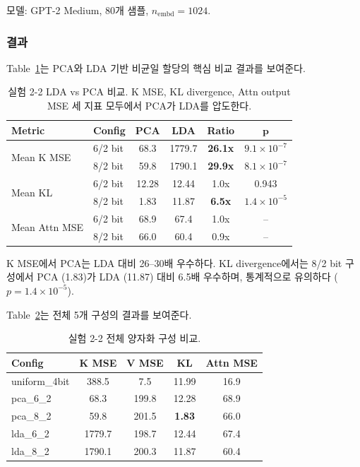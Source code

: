 \documentclass[11pt,a4paper]{article}
\begin{document}
모델: GPT-2 Medium, 80개 샘플, $n_\mathrm{embd} = 1024$.

\subsubsection{결과}

Table~\ref{tab:lda_pca}는 PCA와 LDA 기반 비균일 할당의 핵심 비교 결과를 보여준다.

\begin{table}[H]
\centering
\caption{실험 2-2 LDA vs PCA 비교. K MSE, KL divergence, Attn output MSE 세 지표 모두에서 PCA가 LDA를 압도한다.}
\label{tab:lda_pca}
\begin{tabular}{llcccc}
\toprule
\textbf{Metric} & \textbf{Config} & \textbf{PCA} & \textbf{LDA} & \textbf{Ratio} & $\boldsymbol{p}$ \\
\midrule
\multirow{2}{*}{Mean K MSE} & 6/2 bit & 68.3 & 1779.7 & \textbf{26.1x} & $9.1 \times 10^{-7}$ \\
 & 8/2 bit & 59.8 & 1790.1 & \textbf{29.9x} & $8.1 \times 10^{-7}$ \\
\midrule
\multirow{2}{*}{Mean KL} & 6/2 bit & 12.28 & 12.44 & 1.0x & 0.943 \\
 & 8/2 bit & 1.83 & 11.87 & \textbf{6.5x} & $1.4 \times 10^{-5}$ \\
\midrule
\multirow{2}{*}{Mean Attn MSE} & 6/2 bit & 68.9 & 67.4 & 1.0x & -- \\
 & 8/2 bit & 66.0 & 60.4 & 0.9x & -- \\
\bottomrule
\end{tabular}
\end{table}

K MSE에서 PCA는 LDA 대비 26--30배 우수하다.
KL divergence에서는 8/2 bit 구성에서 PCA (1.83)가 LDA (11.87) 대비 6.5배 우수하며, 통계적으로 유의하다 ($p = 1.4 \times 10^{-5}$).

Table~\ref{tab:all_configs}는 전체 5개 구성의 결과를 보여준다.

\begin{table}[H]
\centering
\caption{실험 2-2 전체 양자화 구성 비교.}
\label{tab:all_configs}
\begin{tabular}{lcccc}
\toprule
\textbf{Config} & \textbf{K MSE} & \textbf{V MSE} & \textbf{KL} & \textbf{Attn MSE} \\
\midrule
uniform\_4bit & 388.5 & 7.5 & 11.99 & 16.9 \\
pca\_6\_2 & 68.3 & 199.8 & 12.28 & 68.9 \\
pca\_8\_2 & 59.8 & 201.5 & \textbf{1.83} & 66.0 \\
lda\_6\_2 & 1779.7 & 198.7 & 12.44 & 67.4 \\
lda\_8\_2 & 1790.1 & 200.3 & 11.87 & 60.4 \\
\bottomrule
\end{tabular}
\end{table}
\end{document}
